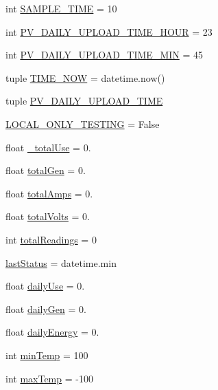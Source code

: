 \begin{DoxyCompactItemize}
\item 
int \hyperlink{namespacekaco2pvo_aa1171dcdb6218f78cd24095e33df03b0}{S\+A\+M\+P\+L\+E\+\_\+\+T\+I\+M\+E} = 10
\item 
int \hyperlink{namespacekaco2pvo_a8ee8c3a356a6e5070403190c5a5c111c}{P\+V\+\_\+\+D\+A\+I\+L\+Y\+\_\+\+U\+P\+L\+O\+A\+D\+\_\+\+T\+I\+M\+E\+\_\+\+H\+O\+U\+R} = 23
\item 
int \hyperlink{namespacekaco2pvo_adfa392fe355836276e546d4d6d4eca52}{P\+V\+\_\+\+D\+A\+I\+L\+Y\+\_\+\+U\+P\+L\+O\+A\+D\+\_\+\+T\+I\+M\+E\+\_\+\+M\+I\+N} = 45
\item 
tuple \hyperlink{namespacekaco2pvo_ad285210c5c2a47f71ea80963c7ec5659}{T\+I\+M\+E\+\_\+\+N\+O\+W} = datetime.\+now()
\item 
tuple \hyperlink{namespacekaco2pvo_acdd697a7c8e4d2d9d64dc216df3eca02}{P\+V\+\_\+\+D\+A\+I\+L\+Y\+\_\+\+U\+P\+L\+O\+A\+D\+\_\+\+T\+I\+M\+E}
\item 
\hyperlink{namespacekaco2pvo_abc161ff89f5e21fa7d1b55b5c7d63fcf}{L\+O\+C\+A\+L\+\_\+\+O\+N\+L\+Y\+\_\+\+T\+E\+S\+T\+I\+N\+G} = False
\item 
float \hyperlink{namespacekaco2pvo_a399c82a403a1875f6361db0c965eb28b}{\+\_\+total\+Use} = 0.
\item 
float \hyperlink{namespacekaco2pvo_a6a9f776486bf396d4fc1fe7e58b49504}{total\+Gen} = 0.
\item 
float \hyperlink{namespacekaco2pvo_a0896e4e9c1e2071ff9dad79ca4c1ac90}{total\+Amps} = 0.
\item 
float \hyperlink{namespacekaco2pvo_a494df69766f24f66f1cc08bd7c12391e}{total\+Volts} = 0.
\item 
int \hyperlink{namespacekaco2pvo_ae4761990f981a3df61f7d33feda1bd7d}{total\+Readings} = 0
\item 
\hyperlink{namespacekaco2pvo_a7c3c6c8c268272c74c596e1ab4e62db8}{last\+Status} = datetime.\+min
\item 
float \hyperlink{namespacekaco2pvo_a7067b502b347ed0976ff588659da54f3}{daily\+Use} = 0.
\item 
float \hyperlink{namespacekaco2pvo_a0869eb37a51cb27c283bbd7399e48751}{daily\+Gen} = 0.
\item 
float \hyperlink{namespacekaco2pvo_adc1dd81395978d32a695d89283409598}{daily\+Energy} = 0.
\item 
int \hyperlink{namespacekaco2pvo_affe215a515246118e429d007acb723a8}{min\+Temp} = 100
\item 
int \hyperlink{namespacekaco2pvo_afc870a268fa08b616db16d50b19bbd90}{max\+Temp} = -\/100

\end{DoxyCompactItemize}
